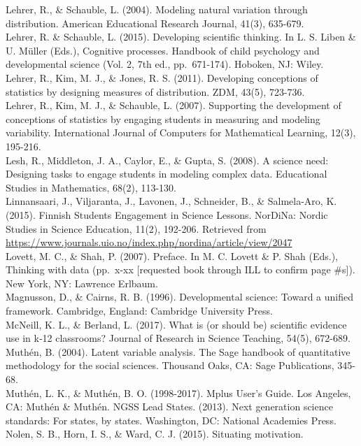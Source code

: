 \documentclass[]{msu-thesis}
\theoremstyle{definition}
\theoremstyle{definition}
\theoremstyle{definition}
\theoremstyle{remark}
\begin{document}
Lehrer, R., \& Schauble, L. (2004). Modeling natural variation through
distribution. American Educational Research Journal, 41(3), 635-679.\\
Lehrer, R. \& Schauble, L. (2015). Developing scientific thinking. In L.
S. Liben \& U. Müller (Eds.), Cognitive processes. Handbook of child
psychology and developmental science (Vol. 2, 7th ed., pp.~671-174).
Hoboken, NJ: Wiley.\\
Lehrer, R., Kim, M. J., \& Jones, R. S. (2011). Developing conceptions
of statistics by designing measures of distribution. ZDM, 43(5),
723-736.\\
Lehrer, R., Kim, M. J., \& Schauble, L. (2007). Supporting the
development of conceptions of statistics by engaging students in
measuring and modeling variability. International Journal of Computers
for Mathematical Learning, 12(3), 195-216.\\
Lesh, R., Middleton, J. A., Caylor, E., \& Gupta, S. (2008). A science
need: Designing tasks to engage students in modeling complex data.
Educational Studies in Mathematics, 68(2), 113-130.\\
Linnansaari, J., Viljaranta, J., Lavonen, J., Schneider, B., \&
Salmela-Aro, K. (2015). Finnish Students Engagement in Science Lessons.
NorDiNa: Nordic Studies in Science Education, 11(2), 192-206. Retrieved
from
\url{https://www.journals.uio.no/index.php/nordina/article/view/2047}\\
Lovett, M. C., \& Shah, P. (2007). Preface. In M. C. Lovett \& P. Shah
(Eds.), Thinking with data (pp.~x-xx {[}requested book through ILL to
confirm page \#s{]}). New York, NY: Lawrence Erlbaum.\\
Magnusson, D., \& Cairns, R. B. (1996). Developmental science: Toward a
unified framework. Cambridge, England: Cambridge University Press.\\
McNeill, K. L., \& Berland, L. (2017). What is (or should be) scientific
evidence use in k‐12 classrooms? Journal of Research in Science
Teaching, 54(5), 672-689.\\
Muthén, B. (2004). Latent variable analysis. The Sage handbook of
quantitative methodology for the social sciences. Thousand Oaks, CA:
Sage Publications, 345-68.\\
Muthén, L. K., \& Muthén, B. O. (1998-2017). Mplus User's Guide. Los
Angeles, CA: Muthén \& Muthén. NGSS Lead States. (2013). Next generation
science standards: For states, by states. Washington, DC: National
Academies Press.\\
Nolen, S. B., Horn, I. S., \& Ward, C. J. (2015). Situating motivation.
\end{document}
